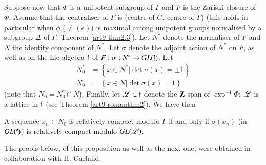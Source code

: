 \subsection{}\label{art9-subsec2.7}
Suppose now that $\Phi$ is a unipotent subgroup of $\Gamma$ and $F$ is the Zariski-closure of $\Phi$. Assume that the centraliser of $F$ is (centre of $G$. centre of $F$) (this holds in particular when $\phi$ ($\neq (e)$) is maximal among unipotent groups normalised by a subgroup $\Delta$ of $\Gamma$: Theorem \ref{art9-thm2.3}). Let $N^\ast$ denote the normaliser of $F$ and $N$ the identity component of $N^\ast$. Let $\sigma$ denote the adjoint action of $N^\ast$ on $F$, as well as on the Lie algebra $\mathfrak{f}$ of $F : \sigma : N^\ast \to G L (\mathfrak{f})$. Let 
\begin{align*}
N^\ast_0  & = \left\{x \in N^\ast \big| \det \sigma (x) = \pm 1 \right\}\\
N_0 & = \left\{x \in N \big| \det \sigma (x) = 1 \right\}
\end{align*}
(note that $N_0 = N^\ast_0 \cap N$). Finally, let $\mathscr{L} \subset \mathfrak{f}$ denote the $\mathbf{Z}$-span of $\exp^{-1} \Phi$; $\mathscr{L}$ is a lattice in $\mathfrak{f}$ (see Theorem \ref{art9-romanthm2}). We have then 

\setcounter{definition}{7}
\begin{proposition}\label{art9-prop2.8}
A sequence $x_n \in N_0$ is relatively compact modulo $\Gamma$ if and only if $\sigma(x_n)$ (in $GL(\mathfrak{f})$) is relatively compact modulo $GL(\mathscr{L})$.
\end{proposition}

The proofs below, of this proposition as well as the next one, were obtained in collaboration with H. Garland.

\setcounter{subsection}{8}
